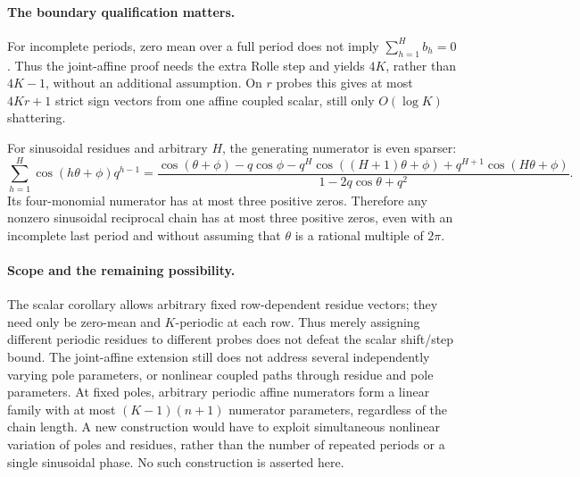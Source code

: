 \documentclass[11pt]{article}
\begin{document}
\paragraph{The boundary qualification matters.}
For incomplete periods, zero mean over a full period does not imply
$\sum_{h=1}^H b_h=0$. Thus the joint-affine proof needs the extra
Rolle step and yields $4K$, rather than $4K-1$, without an additional
assumption. On $r$ probes this gives at most $4Kr+1$ strict sign vectors
from one affine coupled scalar, still only $O(\log K)$ shattering.

For sinusoidal residues and arbitrary $H$, the generating numerator
is even sparser:
\[
 \sum_{h=1}^H\cos(h\theta+\phi)q^{h-1}
 =\frac{\cos(\theta+\phi)-q\cos\phi
        -q^H\cos((H+1)\theta+\phi)
        +q^{H+1}\cos(H\theta+\phi)}
       {1-2q\cos\theta+q^2}.
\]
Its four-monomial numerator has at most three positive zeros.
Therefore any nonzero sinusoidal reciprocal chain has at most three
positive zeros, even with an incomplete last period and without
assuming that $\theta$ is a rational multiple of $2\pi$.

\paragraph{Scope and the remaining possibility.}
The scalar corollary allows arbitrary fixed row-dependent residue
vectors; they need only be zero-mean and $K$-periodic at each row.
Thus merely assigning different periodic residues to different probes
does not defeat the scalar shift/step bound. The joint-affine extension still does not address
several independently varying pole parameters, or nonlinear coupled
paths through residue and pole parameters. At fixed poles, arbitrary periodic
affine numerators form a linear family with at most
$(K-1)(n+1)$ numerator parameters, regardless of the chain length.
A new construction would have to exploit simultaneous nonlinear
variation of poles and residues, rather than the number of repeated
periods or a single sinusoidal phase. No such construction is asserted
here.
\end{document}
